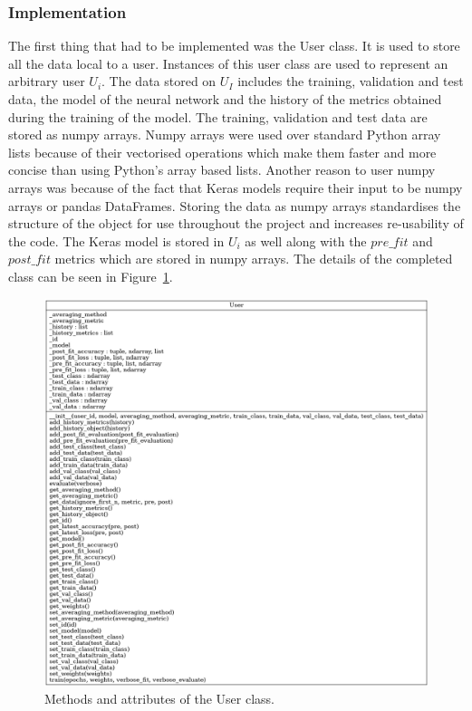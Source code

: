 \documentclass[12pt]{article}
\begin{document}
\subsubsection{Implementation}
The first thing that had to be implemented was the User class. It is used to store all the data local to a user. Instances of this user class are used to represent an arbitrary user $U_i$. The data stored on $U_I$ includes the training, validation and test data, the model of the neural network and the history of the metrics obtained during the training of the model. The training, validation and test data are stored as numpy arrays. Numpy arrays were used over standard Python array lists because of their vectorised operations which make them faster and more concise than using Python's array based lists. Another reason to user numpy arrays was because of the fact that Keras models require their input to be numpy arrays or pandas DataFrames. Storing the data as numpy arrays standardises the structure of the object for use throughout the project and increases re-usability of the code. The Keras model is stored in $U_i$ as well along with the $pre\_fit$ and $post\_fit$ metrics which are stored in numpy arrays. The details of the completed class can be seen in Figure~\ref{fig:classes_user}. 
\begin{figure}[H]
	\centering
	\includegraphics[width=\linewidth]{resources/classes_User.png}
	\caption{Methods and attributes of the User class.}
	\label{fig:classes_user}
\end{figure}
\end{document}
